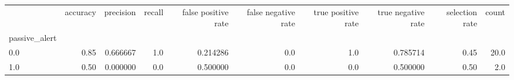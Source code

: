 \begin{tabular}{lrrrrrrrrr}
\toprule
{} &  accuracy &  precision &  recall &  false positive rate &  false negative rate &  true positive rate &  true negative rate &  selection rate &  count \\
passive\_alert &           &            &         &                      &                      &                     &                     &                 &        \\
\midrule
0.0           &      0.85 &   0.666667 &     1.0 &             0.214286 &                  0.0 &                 1.0 &            0.785714 &            0.45 &   20.0 \\
1.0           &      0.50 &   0.000000 &     0.0 &             0.500000 &                  0.0 &                 0.0 &            0.500000 &            0.50 &    2.0 \\
\bottomrule
\end{tabular}
